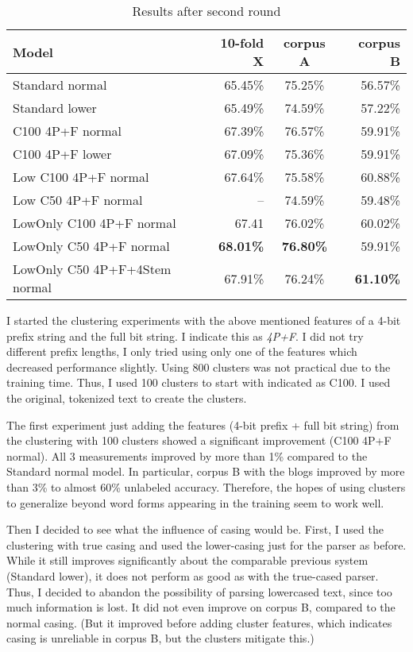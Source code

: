 \documentclass[11pt,letterpaper, covington]{article}
\begin{document}
\begin{table}
\center
  \begin{tabular}{ | l || r | c | r | }
    \hline
   \textbf{Model} & \textbf{10-fold X} & \textbf{corpus A} & \textbf{corpus B}  \\ \hline
    Standard normal & 65.45\% & 75.25\% & 56.57\% \\ 
    Standard lower & 65.49\% & 74.59\% & 57.22\% \\
    C100 4P+F normal & 67.39\% & 76.57\% & 59.91\% \\
    C100 4P+F lower & 67.09\% & 75.36\% & 59.91\% \\
    Low C100 4P+F normal & 67.64\% & 75.58\% & 60.88\% \\
    Low C50 4P+F normal & -- & 74.59\%  & 59.48\% \\
    LowOnly C100 4P+F normal & 67.41 & 76.02\%  & 60.02\% \\
    LowOnly C50 4P+F normal & \textbf{68.01\%}& \textbf{76.80\%} & 59.91\% \\
    LowOnly C50 4P+F+4Stem normal & 67.91\% & 76.24\% & \textbf{61.10\%} \\ \hline
  \end{tabular}
\caption{Results after second round}
\label{tab:rnd2}
\end{table}

I started the clustering experiments with the above mentioned features of a 4-bit prefix string and the full bit string. I indicate this as \emph{4P+F}. I did not try different prefix lengths, I only tried using only one of the features which decreased performance slightly. Using 800 clusters was not practical due to the training time. Thus, I used 100 clusters to start with indicated as C100. I used the original, tokenized text to create the clusters.

The first experiment just adding the features (4-bit prefix + full bit string) from the clustering with 100 clusters showed a significant improvement (C100 4P+F normal). All 3 measurements improved by more than 1\% compared to the Standard normal model. In particular, corpus B with the blogs improved by more than 3\% to almost 60\% unlabeled accuracy. Therefore, the hopes of using clusters to generalize beyond word forms appearing in the training seem to work well. 

Then I decided to see what the influence of casing would be. First, I used the clustering with true casing and used the lower-casing just for the parser as before. While it still improves significantly about the comparable previous system (Standard lower), it does not perform as good as with the true-cased parser. Thus, I decided to abandon the possibility of parsing lowercased text, since too much information is lost. It did not even improve on corpus B, compared to the normal casing. (But it improved before adding cluster features, which indicates casing is unreliable in corpus B, but the clusters mitigate this.)
 
\end{document}
